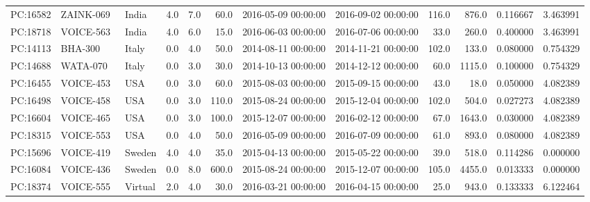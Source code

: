 \begin{tabular}{lllrrrllrrrr}
 PC:16582 &    ZAINK-069 &    India &       4.0 &              7.0 &              60.0 &  2016-05-09 00:00:00 &  2016-09-02 00:00:00 &     116.0 &          876.0 &     0.116667 &            3.463991 \\
 PC:18718 &    VOICE-563 &    India &       4.0 &              6.0 &              15.0 &  2016-06-03 00:00:00 &  2016-07-06 00:00:00 &      33.0 &          260.0 &     0.400000 &            3.463991 \\
 PC:14113 &      BHA-300 &    Italy &       0.0 &              4.0 &              50.0 &  2014-08-11 00:00:00 &  2014-11-21 00:00:00 &     102.0 &          133.0 &     0.080000 &            0.754329 \\
 PC:14688 &     WATA-070 &    Italy &       0.0 &              3.0 &              30.0 &  2014-10-13 00:00:00 &  2014-12-12 00:00:00 &      60.0 &         1115.0 &     0.100000 &            0.754329 \\
 PC:16455 &    VOICE-453 &      USA &       0.0 &              3.0 &              60.0 &  2015-08-03 00:00:00 &  2015-09-15 00:00:00 &      43.0 &           18.0 &     0.050000 &            4.082389 \\
 PC:16498 &    VOICE-458 &      USA &       0.0 &              3.0 &             110.0 &  2015-08-24 00:00:00 &  2015-12-04 00:00:00 &     102.0 &          504.0 &     0.027273 &            4.082389 \\
 PC:16604 &    VOICE-465 &      USA &       0.0 &              3.0 &             100.0 &  2015-12-07 00:00:00 &  2016-02-12 00:00:00 &      67.0 &         1643.0 &     0.030000 &            4.082389 \\
 PC:18315 &    VOICE-553 &      USA &       0.0 &              4.0 &              50.0 &  2016-05-09 00:00:00 &  2016-07-09 00:00:00 &      61.0 &          893.0 &     0.080000 &            4.082389 \\
 PC:15696 &   VOICE-419  &   Sweden &       4.0 &              4.0 &              35.0 &  2015-04-13 00:00:00 &  2015-05-22 00:00:00 &      39.0 &          518.0 &     0.114286 &            0.000000 \\
 PC:16084 &    VOICE-436 &   Sweden &       0.0 &              8.0 &             600.0 &  2015-08-24 00:00:00 &  2015-12-07 00:00:00 &     105.0 &         4455.0 &     0.013333 &            0.000000 \\
 PC:18374 &    VOICE-555 &  Virtual &       2.0 &              4.0 &              30.0 &  2016-03-21 00:00:00 &  2016-04-15 00:00:00 &      25.0 &          943.0 &     0.133333 &            6.122464 \\
\bottomrule
\end{tabular}
